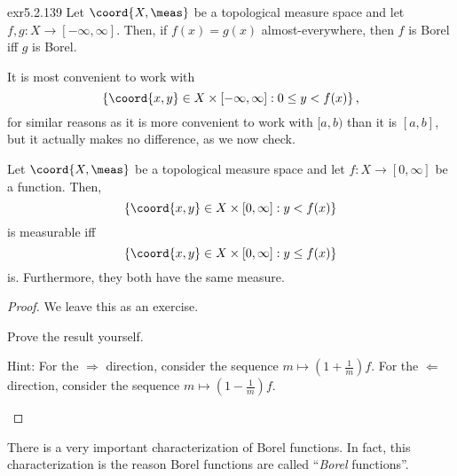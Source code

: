 \begin{exr}{}{exr5.2.139}
Let $\coord{X,\meas}$ be a topological measure space and let $f,g\colon X\rightarrow [-\infty ,\infty ]$.  Then, if $f(x)=g(x)$ almost-everywhere, then $f$ is Borel iff $g$ is Borel.
\end{exr}

It is most convenient to work with
\begin{equation}
\left\{ \coord{x,y}\in X\times [-\infty ,\infty ]:0\leq y<f(x)\right\} ,
\end{equation}
for similar reasons as it is more convenient to work with $[a,b)$ than it is $[a,b]$, but it actually makes no difference, as we now check.
\begin{prp}{}{}
Let $\coord{X,\meas}$ be a topological measure space and let $f\colon X\rightarrow [0,\infty ]$ be a function.  Then,
\begin{equation}
\left\{ \coord{x,y}\in X\times [0,\infty ]:y<f(x)\right\}
\end{equation}
is measurable iff
\begin{equation}
\left\{ \coord{x,y}\in X\times [0,\infty ]:y\leq f(x)\right\} 
\end{equation}
is.  Furthermore, they both have the same measure.
\begin{proof}
We leave this as an exercise.
\begin{exr}{}{}
Prove the result yourself.
\begin{rmk}
Hint:  For the $\Rightarrow$ direction, consider the sequence $m\mapsto \left( 1+\frac{1}{m}\right) f$.  For the $\Leftarrow$ direction, consider the sequence $m\mapsto \left( 1-\frac{1}{m}\right) f$.
\end{rmk}
\end{exr}
\end{proof}
\end{prp}
There is a very important characterization of Borel functions.  In fact, this characterization is the reason Borel functions are called  ``\emph{Borel} functions''.
